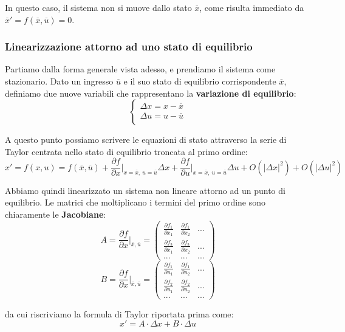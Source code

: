 \documentclass[a4paper,11pt]{article}
\begin{document}
In questo caso, il sistema non si muove dallo stato $\overline{x}$, come risulta immediato da $\overline{x}' = f(\overline{x}, \overline{u}) = 0$.

\subsubsection{Linearizzazione attorno ad uno stato di equilibrio}
Partiamo dalla forma generale vista adesso, e prendiamo il sistema come stazionario.
Dato un ingresso $\overline{u}$ e il suo stato di equilibrio corrispondente $\overline{x}$, definiamo due nuove variabili che rappresentano la \textbf{variazione di equilibrio}:
\[
	\begin{cases}
		\Delta x = x - \overline{x} \\ 	
		\Delta u = u - \overline{u} \\ 	
	\end{cases}
\]

A questo punto possiamo scrivere le equazioni di stato attraverso la serie di Taylor centrata nello stato di equilibrio troncata al primo ordine:
$$
x' = f(x, u)
= f(\overline{x}, \overline{u}) + \frac{\partial f}{\partial x} \Bigg|_{x = \overline{x}, \ u = \overline{u}} \Delta x
+ \frac{\partial f}{\partial u} \Bigg|_{x = \overline{x}, \ u = \overline{u}} \Delta u
+ O(|\Delta x|^2)
+ O(|\Delta u|^2)
$$

Abbiamo quindi linearizzato un sistema non lineare attorno ad un punto di equilibrio.
Le matrici che moltiplicano i termini del primo ordine sono chiaramente le \textbf{Jacobiane}:
$$
A = \frac{\partial f}{\partial x} \Bigg|_{\overline{x}, \overline{u}} = \begin{pmatrix}
	\frac{\partial f_1}{\partial x_1} & \frac{\partial f_1}{\partial x_2} & ... \\ 
	\frac{\partial f_2}{\partial x_1} & \frac{\partial f_2}{\partial x_2} & ... \\ 
	... & ... & ...
\end{pmatrix}
$$
$$
B = \frac{\partial f}{\partial x} \Bigg|_{\overline{x}, \overline{u}} = \begin{pmatrix}
	\frac{\partial f_1}{\partial u_1} & \frac{\partial f_1}{\partial u_2} & ... \\ 
	\frac{\partial f_2}{\partial u_1} & \frac{\partial f_2}{\partial u_2} & ... \\ 
	... & ... & ...
\end{pmatrix}
$$

da cui riscriviamo la formula di Taylor riportata prima come:
$$
x' = A \cdot \Delta x + B \cdot \Delta u
$$ 
\end{document}
